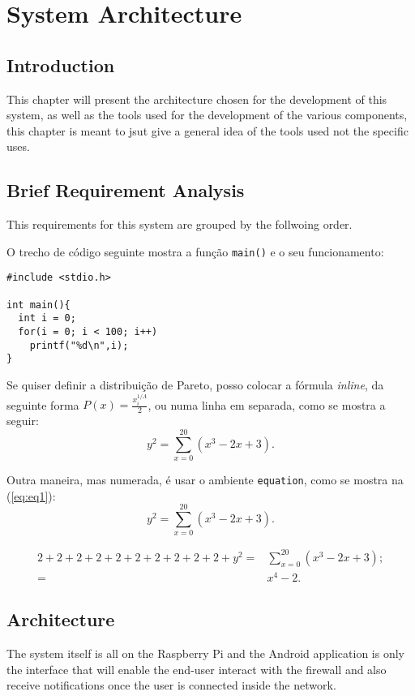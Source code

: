 \chapter{System Architecture}
\label{chap:sys-arch}

\section{Introduction}
\label{chap3:sec:intro}
This chapter will present the architecture chosen for the development of this
system, as well as the tools used for the development of the various components,
this chapter is meant to jsut give a general idea of the tools used not the
specific uses.

\section{Brief Requirement Analysis}
\label{chap3:sec:reqs}

This requirements for this system are grouped by the follwoing order.

O trecho de código seguinte mostra a função \texttt{main()} e o seu funcionamento:
\begin{lstlisting}[caption=Trecho de código usado no projeto.]
#include <stdio.h>

int main(){
  int i = 0;
  for(i = 0; i < 100; i++)
    printf("%d\n",i);
}
\end{lstlisting}


Se quiser definir a distribuição de Pareto, posso colocar a fórmula \emph{inline}, da seguinte forma $P(x)=\frac{x^{1/\Lambda}_{i}}{2}$, ou numa linha em separada, como se mostra a seguir:
$$ y^2 = \sum_{x=0}^{20}( x^3 - 2x + 3).$$

Outra maneira, mas numerada, é usar o ambiente \texttt{equation}, como se mostra na (\ref{eq:eq1}):
\begin{equation}
 y^2 = \sum_{x=0}^{20}( x^3 - 2x + 3).
 \label{eq:eq1}
\end{equation}

\begin{align}
 2+2+2+2+2+2+2+2+2+2+y^2 = & \sum_{x=0}^{20}( x^3 - 2x + 3);\\
                         = & x^4 -2.
 \label{eq:eq2}
\end{align}

\section{Architecture}
\label{chap3:sec:arch}
The system itself is all on the Raspberry Pi and the Android application is only
the interface that will enable the end-user interact with the firewall and also
receive notifications once the user is connected inside the network.


